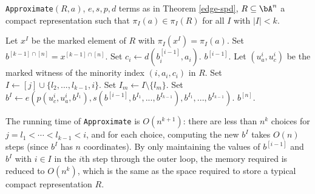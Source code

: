
\begin{algorithm}
\caption{\texttt{Approximate}$(R, a)$, $e,s,p,d$ terms as in Theorem \ref{edge-spd}, $R \subseteq \bA^n$ a compact representation such that $\pi_I(a) \in \pi_I(R)$ for all $I$ with $|I| < k$.}
\begin{algorithmic}[1]
\State Let $x^I$ be the marked element of $R$ with $\pi_I(x^I) = \pi_I(a)$.
\EndFor
\State Set $b^{[k-1]\cap[n]} = x^{[k-1]\cap[n]}$.
\State Set $c_i \gets d(b^{[i-1]}_i,a_i)$.
\State \Return $b^{[i-1]}$.
\Else
\State Let $(u^i_a,u^i_c)$ be the marked witness of the minority index $(i,a_i,c_i)$ in $R$.
\EndIf
{}
\State Set $I \gets [j] \cup \{l_2, ..., l_{k-1}, i\}$.
\State Set $I_m \gets I\setminus \{l_m\}$.
\EndFor
\State Set $b^I \gets e(p(u^i_c,u^i_a,b^{I_1}),s(b^{[i-1]},b^{I_1},...,b^{I_{k-1}}),b^{I_1},...,b^{I_{k-1}})$.
\EndFor
\EndFor
\EndFor
\State \Return $b^{[n]}$.
\end{algorithmic}
\end{algorithm}

The running time of \texttt{Approximate} is $O(n^{k+1})$: there are less than $n^k$ choices for $j = l_1 < \cdots < l_{k-1} < i$, and for each choice, computing the new $b^I$ takes $O(n)$ steps (since $b^I$ has $n$ coordinates). By only maintaining the values of $b^{[i-1]}$ and $b^I$ with $i \in I$ in the $i$th step through the outer loop, the memory required is reduced to $O(n^k)$, which is the same as the space required to store a typical compact representation $R$.

